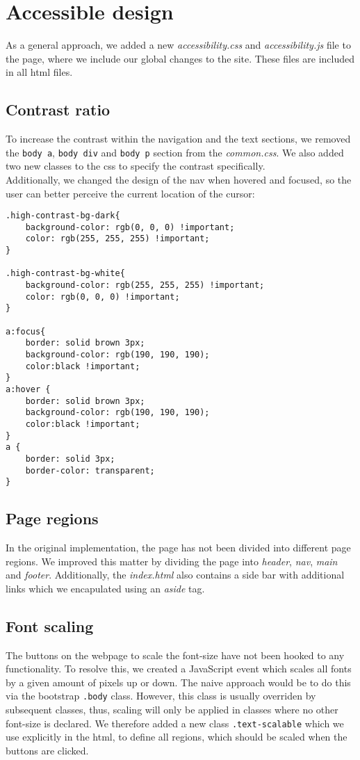 \documentclass[a4paper,11pt]{article}
\theoremstyle{mytheor}
\begin{document}
\newpage
\section{Accessible design}
As a general approach, we added a new \emph{accessibility.css} and \emph{accessibility.js} file to the page, where we include our global changes to the site. These files are included in all html files. 

\subsection{Contrast ratio}
To increase the contrast within the navigation and the text sections, we removed the \texttt{body a}, \texttt{body div} and \texttt{body p} section from the \emph{common.css}. We also added two new classes to the css to specify the contrast specifically. \\
Additionally, we changed the design of the nav when hovered and focused, so the user can better perceive the current location of the cursor: 


\begin{verbatim}
.high-contrast-bg-dark{
    background-color: rgb(0, 0, 0) !important;
    color: rgb(255, 255, 255) !important;
}

.high-contrast-bg-white{
    background-color: rgb(255, 255, 255) !important;
    color: rgb(0, 0, 0) !important;
}

a:focus{
    border: solid brown 3px;
    background-color: rgb(190, 190, 190);
    color:black !important;
}
a:hover {
    border: solid brown 3px;
    background-color: rgb(190, 190, 190);
    color:black !important;
}
a {
    border: solid 3px;
    border-color: transparent;
}

\end{verbatim}

\subsection{Page regions}
In the original implementation, the page has not been divided into different page regions. We  improved this matter by dividing the page into \emph{header}, \emph{nav},  \emph{main} and  \emph{footer}. Additionally, the \emph{index.html} also contains a side bar with additional links which we encapulated using an \emph{aside} tag.

\subsection{Font scaling}
The buttons on the webpage to scale the font-size have not been hooked to any functionality. To resolve this, we created a JavaScript event which scales all fonts by a given amount of pixels up or down. The naive approach would be to do this via the bootstrap \texttt{.body} class. However, this class is usually overriden by subsequent classes, thus, scaling will only be applied in classes where no other font-size is declared. We therefore added a new class \texttt{.text-scalable} which we use explicitly in the html, to define all regions, which should be scaled when the buttons are clicked. \\
\end{document}

